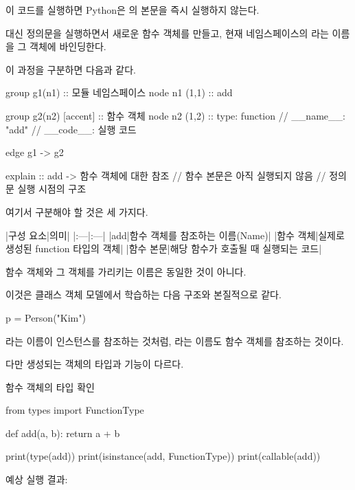 이 코드를 실행하면 Python은 의 본문을 즉시 실행하지 않는다.

대신  정의문을 실행하면서 새로운 함수 객체를 만들고, 현재 네임스페이스의 라는 이름을 그 객체에 바인딩한다.

이 과정을 구분하면 다음과 같다.

\begin{dhkgraph}[uniform]
group g1(n1) :: 모듈 네임스페이스
node n1 (1,1) :: add

group g2(n2) [accent] :: 함수 객체
node n2 (1,2) :: type: function // __name__: "add" // __code__: 실행 코드

edge g1 -> g2

explain :: add -> 함수 객체에 대한 참조 // 함수 본문은 아직 실행되지 않음 // 정의문 실행 시점의 구조
\end{dhkgraph}

여기서 구분해야 할 것은 세 가지다.

\begin{dhktable}
|구성 요소|의미|
|:---|:---|
|add|함수 객체를 참조하는 이름(Name)|
|함수 객체|실제로 생성된 function 타입의 객체|
|함수 본문|해당 함수가 호출될 때 실행되는 코드|
\end{dhktable}

함수 객체와 그 객체를 가리키는 이름은 동일한 것이 아니다.

이것은 클래스 객체 모델에서 학습하는 다음 구조와 본질적으로 같다.

\begin{dhkcode}
p = Person("Kim")
\end{dhkcode}

라는 이름이  인스턴스를 참조하는 것처럼, 라는 이름도 함수 객체를 참조하는 것이다.

다만 생성되는 객체의 타입과 기능이 다르다.

\begin{dhknote}
\begin{dhksmry}[centered]
함수 객체의 타입 확인
\end{dhksmry}
\end{dhknote}

\begin{dhkcode}
from types import FunctionType

def add(a, b):
    return a + b

print(type(add))
print(isinstance(add, FunctionType))
print(callable(add))
\end{dhkcode}

예상 실행 결과:

